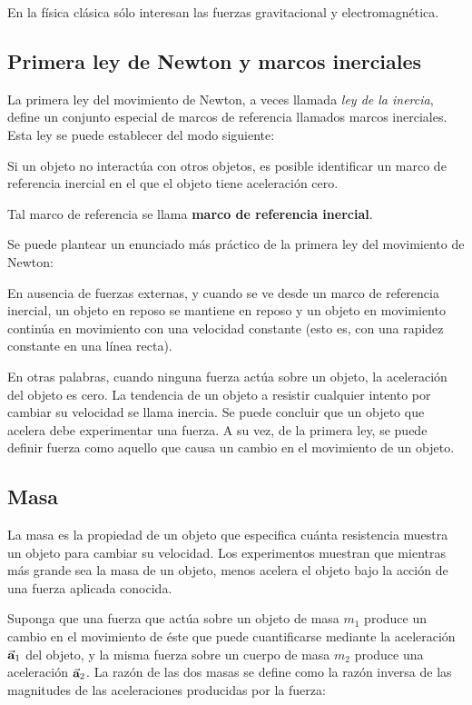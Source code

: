     \PN En la física clásica sólo interesan las fuerzas gravitacional y electromagnética.

  \subsection{Primera ley de Newton y marcos inerciales}
    \PN La primera ley del movimiento de Newton, a veces llamada \textit{ley de la inercia}, define un conjunto especial
    de marcos de referencia llamados marcos inerciales. Esta ley se puede establecer del modo siguiente:

    \begin{tcolorbox}
      Si un objeto no interactúa con otros objetos, es posible identificar un marco de referencia inercial en el que el
      objeto tiene aceleración cero.
    \end{tcolorbox}

    \PN Tal marco de referencia se llama \textbf{marco de referencia inercial}.

    \PN Se puede plantear un enunciado más práctico de la primera ley del movimiento de Newton:

    \begin{tcolorbox}
      En ausencia de fuerzas externas, y cuando se ve desde un marco de referencia inercial, un objeto en reposo se
      mantiene en reposo y un objeto en movimiento continúa en movimiento con una velocidad constante (esto es, con una
      rapidez constante en una línea recta).
    \end{tcolorbox}

    \PN En otras palabras, cuando ninguna fuerza actúa sobre un objeto, la aceleración del objeto es cero. La tendencia
    de un objeto a resistir cualquier intento por cambiar su velocidad se llama inercia. Se puede concluir que un objeto
    que acelera debe experimentar una fuerza. A su vez, de la primera ley, se puede definir fuerza como aquello que
    causa un cambio en el movimiento de un objeto.

  \subsection{Masa}
    \PN La masa es la propiedad de un objeto que especifica cuánta resistencia muestra un objeto para cambiar su
    velocidad. Los experimentos muestran que mientras más grande sea la masa de un objeto, menos acelera el objeto bajo
    la acción de una fuerza aplicada conocida.

    \PN Suponga que una fuerza que actúa sobre un objeto de masa $m_{1}$ produce un cambio en el movimiento de éste que
    puede cuantificarse mediante la aceleración $\vec{\mathbf{a}}_{1}$ del objeto, y la misma fuerza sobre un cuerpo de masa
    $m_{2}$ produce una aceleración $\vec{\mathbf{a}}_{2}$. La razón de las dos masas se define como la razón inversa de las
    magnitudes de las aceleraciones producidas por la fuerza:

